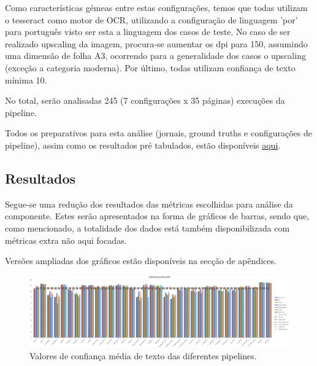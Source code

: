 Como características gémeas entre estas configurações, temos que todas utilizam o tesseract como motor de OCR, utilizando a configuração de linguagem 'por' para português visto ser esta a linguagem dos casos de teste. No caso de ser realizado upscaling da imagem, procura-se aumentar os dpi para 150, assumindo uma dimensão de folha A3, ocorrendo para a generalidade dos casos o upscaling (exceção a categoria moderna). Por último, todas utilizam confiança de texto mínima 10.

No total, serão analisadas 245 (7 configurações x 35 páginas) execuções da pipeline.



Todos os preparativos para esta análise (jornais, ground truths e configurações de pipeline), assim como os resultados pré tabulados, estão disponíveis \href{https://drive.google.com/drive/u/0/folders/1DW-AIuSxjEyv6ioq7jX8P1xruy03Sxo9}{aqui}.


\subsection{Resultados}

Segue-se uma redução dos resultados das métricas escolhidas para análise da componente. Estes serão apresentados na forma de gráficos de barras, sendo que, como mencionado, a totalidade dos dados está também disponibilizada com métricas extra não aqui focadas.

Versões ampliadas dos gráficos estão disponíveis na secção de apêndices.

\begin{figure}[H]
	\centering
	\hspace*{-2cm}
	\includegraphics[width=1.1\textwidth]{images/resultados/graph_avg_text_conf.png}
	\caption{Valores de confiança média de texto das diferentes pipelines.}
	\label{fig:graph_avg_text_conf}
\end{figure}


